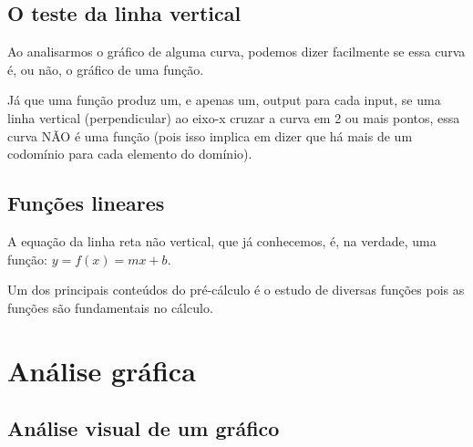 \documentclass[pdftex, brazil, 12pt, twoside]{article}
\begin{document}
\subsection{O teste da linha vertical}
\label{funcoes-teste-linha-vertical}

Ao analisarmos o gráfico de alguma curva, podemos dizer facilmente se essa curva
é, ou não, o gráfico de uma função.

Já que uma função produz um, e apenas um, output para cada input, se uma linha
vertical (perpendicular) ao eixo-x cruzar a curva em 2 ou mais pontos,
essa curva NÃO é uma função (pois isso implica em dizer que há mais de um codomínio
para cada elemento do domínio).

\subsection{Funções lineares}
\label{funcoes-lineares}

A equação da linha reta não vertical, que já conhecemos, é, na verdade,
uma função: $y = f(x) = mx + b$.

Um dos principais conteúdos do pré-cálculo é o estudo de diversas funções pois
as funções são fundamentais no cálculo.




\section{Análise gráfica}
\label{analise-grafica}

\subsection{Análise visual de um gráfico}
\label{analise-grafica-visual}
\end{document}

